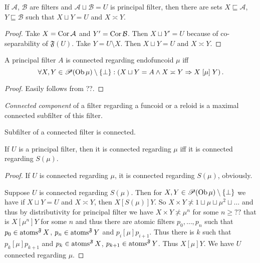 \begin{prop}
  If $\mathcal{A}$, $\mathcal{B}$ are filters and $\mathcal{A} \sqcup
  \mathcal{B} = U$ is principal filter, then there are sets $X \sqsubseteq
  \mathcal{A}$, $Y \sqsubseteq \mathcal{B}$ such that $X \sqcup Y = U$ and $X
  \asymp Y$.
\end{prop}

\begin{proof}
  Take $X = \operatorname{Cor} \mathcal{A}$ and $Y' = \operatorname{Cor} \mathcal{B}$. Then $X
  \sqcup Y' = U$ because of co-separability of $\mathfrak{F} (U)$. Take $Y = U
  \setminus X$. Then $X \sqcup Y = U$ and $X \asymp Y$.
\end{proof}

\begin{prop}
  A principal filter $A$ is connected regarding endofuncoid $\mu$ iff
  \[ \forall X, Y \in \mathscr{P} (\operatorname{Ob} \mu) \setminus \{ \bot \} :
     \left( X \sqcup Y = A \wedge X \asymp Y \Rightarrow X \mathrel{[\mu]} Y
     \right) . \]
\end{prop}

\begin{proof}
  Easily follows from ??.
\end{proof}

\begin{defn}
  \emph{Connected component} of a filter regarding a funcoid or a reloid
  is a maximal
  connected subfilter of this filter.
\end{defn}

\begin{obvious}
Subfilter of a connected filter is connected.
\end{obvious}

\begin{prop}
  If $U$ is a principal filter, then it is connected regarding $\mu$ iff it is
  connected regarding $S (\mu)$.
\end{prop}

\begin{proof}
  If $U$ is connected regarding $\mu$, it is connected regarding $S (\mu)$,
  obviously.

  Suppose $U$ is connected regarding $S (\mu)$. Then for $X, Y \in \mathscr{P}
  (\operatorname{Ob} \mu) \setminus \{ \bot \}$ we have if $X \sqcup Y = U$ and $X
  \asymp Y$, then $X \mathrel{[S (\mu)]} Y$. So $X \times Y \nasymp 1 \sqcup
  \mu \sqcup \mu^2 \sqcup \ldots$ and thus by distributivity for principal
  filter we have $X \times Y \nasymp \mu^n$ for some $n \geq ? ?$ that is $X
  \mathrel{[\mu^n]} Y$ for some $n$ and thus there are atomic filters $p_0,
  \ldots, p_n$ such that $p_0 \in \operatorname{atoms}^{\mathfrak{F}} X$, $p_n \in
  \operatorname{atoms}^{\mathfrak{F}} Y$ and $p_i \mathrel{[\mu]} p_{i + 1}$. Thus
  there is $k$ such that $p_k \mathrel{[\mu]} p_{k + 1}$ and $p_k \in
  \operatorname{atoms}^{\mathfrak{F}} X$, $p_{k + 1} \in \operatorname{atoms}^{\mathfrak{F}}
  Y$. Thus $X \mathrel{[\mu]} Y$. We have $U$ connected regarding $\mu$.
\end{proof}

